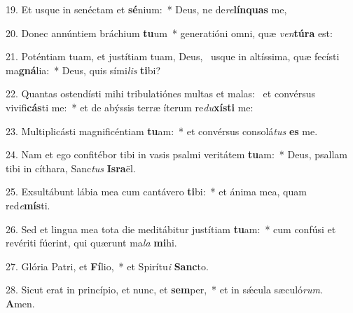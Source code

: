 19. Et usque in senéctam et \textbf{sé}nium:~*  Deus, ne de\textit{re}\textbf{lín}\textbf{quas} me,\

20. Donec annúntiem bráchium \textbf{tu}um~*  generatióni omni, quæ \textit{ven}\textbf{tú}\textbf{ra} est:\

21. Poténtiam tuam, et justítiam tuam, Deus, \dag\  usque in altíssima, quæ fecísti ma\textbf{gná}lia:~*  Deus, quis sími\textit{lis} \textbf{ti}bi?\

22. Quantas ostendísti mihi tribulatiónes multas et malas: \dag\  et convérsus vivifi\textbf{cás}ti me:~*  et de abýssis terræ íterum re\textit{du}\textbf{xís}\textbf{ti} me:\

23. Multiplicásti magnificéntiam \textbf{tu}am:~*  et convérsus consolá\textit{tus} \textbf{es} me.\

24. Nam et ego confitébor tibi in vasis psalmi veritátem \textbf{tu}am:~*  Deus, psallam tibi in cíthara, Sanc\textit{tus} \textbf{Is}\textbf{ra}ël.\

25. Exsultábunt lábia mea cum cantávero \textbf{ti}bi:~*  et ánima mea, quam red\textit{e}\textbf{mís}ti.\

26. Sed et lingua mea tota die meditábitur justítiam \textbf{tu}am:~*  cum confúsi et revériti fúerint, qui quærunt ma\textit{la} \textbf{mi}hi.\

27. Glória Patri, et \textbf{Fí}lio,~*  et Spirítu\textit{i} \textbf{Sanc}to.\

28. Sicut erat in princípio, et nunc, et \textbf{sem}per,~*  et in sǽcula sæculó\textit{rum}. \textbf{A}men.\

